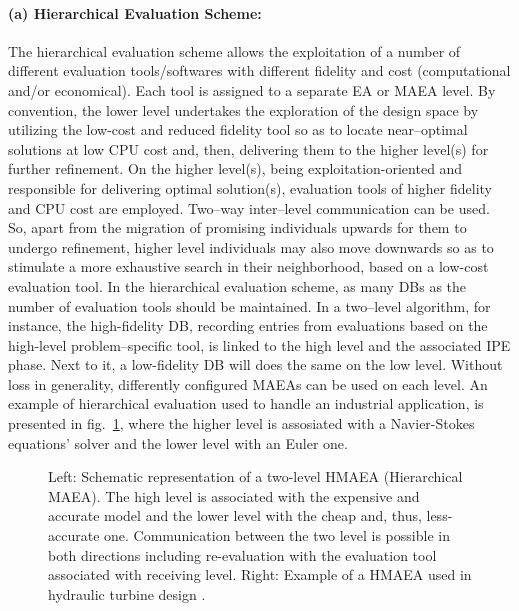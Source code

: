 \paragraph{(a) Hierarchical Evaluation Scheme:}  
The hierarchical evaluation scheme allows the exploitation of a number of different evaluation tools/softwares with different fidelity and cost (computational and/or economical). Each tool is assigned to a separate EA or MAEA level. By convention, the lower level undertakes the exploration of the design space by utilizing the low-cost and reduced fidelity tool so as to locate near–optimal solutions at low CPU cost and, then, delivering them to the higher level(s) for further refinement. On the higher level(s), being exploitation-oriented and responsible for delivering optimal solution(s), evaluation tools of higher fidelity and CPU cost are employed. Two–way inter–level communication can be used. So, apart from the migration of promising individuals upwards for them to undergo refinement, higher level individuals may also move downwards so as to stimulate a more exhaustive search in their neighborhood, based on a low-cost evaluation tool. In the hierarchical evaluation scheme, as many DBs as the number of evaluation tools should be maintained. In a two–level algorithm, for instance, the high-fidelity DB, recording entries from evaluations based on the high-level problem–specific tool, is linked to the high level and the associated IPE phase. Next to it, a low-fidelity DB will does the same on the low level. Without loss in generality, differently configured MAEAs can be used on each level. An example of hierarchical evaluation used to handle an industrial application, is presented in fig.\ \ref{HMAEA}, where the higher level is assosiated with a Navier-Stokes equations' solver and the lower level with an Euler one.


\begin{figure}[h!]
\begin{minipage}[b]{1.0\linewidth}
 \centering
\end{minipage}
\caption{Left: Schematic representation of a two-level HMAEA (Hierarchical MAEA). The high level is associated with the expensive and accurate model and the lower level with the cheap and, thus, less-accurate one. Communication between the two level is possible in both directions including re-evaluation with the evaluation tool associated with receiving level. Right: Example of a HMAEA used in hydraulic turbine design \cite{LTT_3_094}.}
\label{HMAEA}
\end{figure} 


